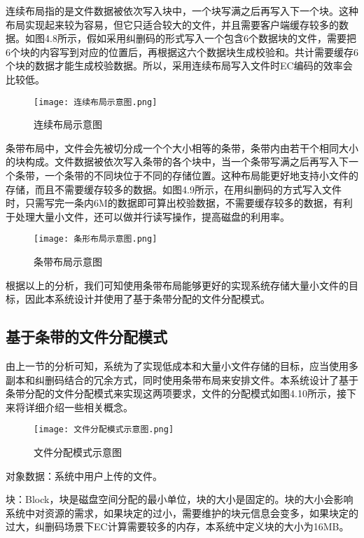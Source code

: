 连续布局指的是文件数据被依次写入块中，一个块写满之后再写入下一个块。这种布局实现起来较为容易，但它只适合较大的文件，并且需要客户端缓存较多的数据。如图4.8所示，假如采用纠删码的形式写入一个包含6个数据块的文件，需要把6个块的内容写到对应的位置后，再根据这六个数据块生成校验和。共计需要缓存6个块的数据才能生成校验数据。所以，采用连续布局写入文件时EC编码的效率会比较低。

\begin{figure}[h]
  \centering
  \texttt{[image: 连续布局示意图.png]}
  \caption{连续布局示意图}
\end{figure}

条带布局中，文件会先被切分成一个个大小相等的条带，条带内由若干个相同大小的块构成。文件数据被依次写入条带的各个块中，当一个条带写满之后再写入下一个条带，一个条带的不同块位于不同的存储位置。这种布局能更好地支持小文件的存储，而且不需要缓存较多的数据。如图4.9所示，在用纠删码的方式写入文件时，只需写完一条内6M的数据即可算出校验数据，不需要缓存较多的数据，有利于处理大量小文件，还可以做并行读写操作，提高磁盘的利用率。

\begin{figure}[h]
  \centering
  \texttt{[image: 条形布局示意图.png]}
  \caption{条带布局示意图}
\end{figure}

根据以上的分析，我们可知使用条带布局能够更好的实现系统存储大量小文件的目标，因此本系统设计并使用了基于条带分配的文件分配模式。

\subsection{基于条带的文件分配模式}%
由上一节的分析可知，系统为了实现低成本和大量小文件存储的目标，应当使用多副本和纠删码结合的冗余方式，同时使用条带布局来安排文件。本系统设计了基于条带分配的文件分配模式来实现这两项要求，文件的分配模式如图4.10所示，接下来将详细介绍一些相关概念。

\begin{figure}[h]
    \centering
    \texttt{[image: 文件分配模式示意图.png]}
    \caption{文件分配模式示意图}
  \end{figure}

对象数据：系统中用户上传的文件。

块：Block，块是磁盘空间分配的最小单位，块的大小是固定的。块的大小会影响系统中对资源的需求，如果块定的过小，需要维护的块元信息会变多，如果块定的过大，纠删码场景下EC计算需要较多的内存，本系统中定义块的大小为16MB。

